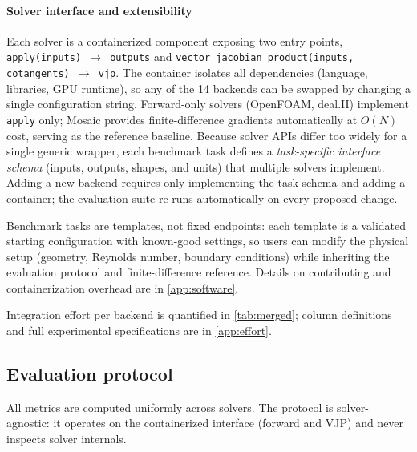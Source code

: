 \documentclass[11pt,a4paper]{article}
\begin{document}
\paragraph{Solver interface and extensibility}
Each solver is a containerized component exposing two entry points,
\texttt{apply(inputs)\,$\rightarrow$\,outputs} and
\texttt{vector\_jacobian\_product(inputs, cotangents)\,$\rightarrow$\,vjp}.
The container isolates all dependencies (language, libraries, GPU
runtime), so any of the 14 backends can be swapped by changing a single
configuration string.
Forward-only solvers
(OpenFOAM, deal.II) implement \texttt{apply} only; Mosaic provides
finite-difference gradients automatically at $O(N)$ cost, serving as the
reference baseline.
Because solver APIs differ too widely for a single generic wrapper, each
benchmark task defines a \emph{task-specific interface schema} (inputs,
outputs, shapes, and units) that multiple solvers implement. Adding a new
backend requires only implementing the task schema and adding a container;
the evaluation suite re-runs automatically on every proposed change.

Benchmark tasks are templates, not fixed endpoints: each template is a
validated starting configuration with known-good settings, so users can
modify the physical setup (geometry, Reynolds number, boundary conditions)
while inheriting the evaluation protocol and finite-difference reference.
Details on contributing and containerization overhead are in \cref{app:software}.

Integration effort per backend is quantified in \cref{tab:merged}; column
definitions and full experimental specifications are in \cref{app:effort}.

\subsection{Evaluation protocol}
\label{sec:protocol}

All metrics are computed uniformly across solvers. The protocol is
solver-agnostic: it operates on the containerized interface (forward and
VJP) and never inspects solver internals.
\end{document}
